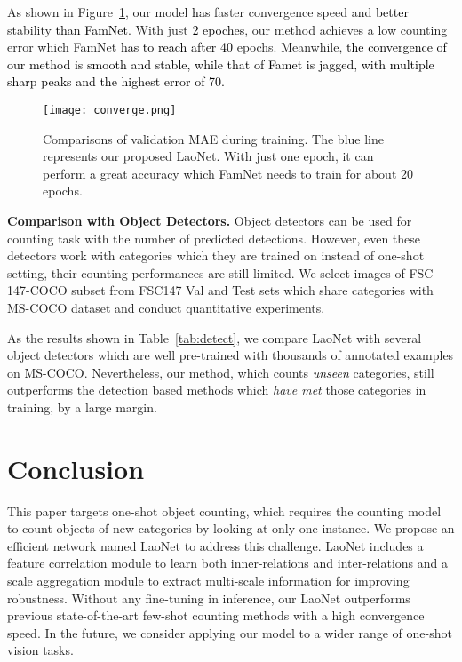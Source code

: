 \documentclass{article}
\newcommand\XP[1]{\textcolor{black}{#1}}\newcommand\XPC[1]{\textcolor{black}{[#1]}}
\begin{document}
As shown in Figure~\ref{fig:converge}, our model \XP{has} faster convergence speed and \XP{better} stability \XP{than FamNet}. With just \XP{2 epoches}, our method achieves a low counting error which FamNet \XP{has to reach after 40} epochs. Meanwhile, \XP{the convergence of our method is smooth and stable, while that of Famet is jagged, with multiple sharp peaks and the highest error of 70.}



\begin{figure}[t]
  \centering
  \texttt{[image: converge.png]}
   \caption{Comparisons of validation MAE during training. The blue line represents our proposed LaoNet. With just one epoch, it can perform a great accuracy which FamNet needs to train for about 20 epochs.}
   \label{fig:converge}
\end{figure}


\noindent \textbf{Comparison with Object Detectors.}
Object detectors can be used for counting task with the number of predicted detections. However, even these detectors work with categories which they are trained on instead of one-shot setting, their counting performances are still limited. We select images of FSC-147-COCO subset from FSC147 Val and Test sets which share categories with MS-COCO dataset and conduct quantitative experiments.

As the results shown in Table~\ref{tab:detect}, we compare LaoNet with several object detectors which are well pre-trained with thousands of annotated examples on MS-COCO. Nevertheless, our method, which counts \XP{\emph{unseen}} categories, still outperforms the detection based methods which \emph{have met} those categories in training, by a large margin.




\section{Conclusion}

This paper targets one-shot object counting, which requires the counting model to count objects of new categories by looking at only one instance. We propose an efficient network named LaoNet to address this challenge. LaoNet includes a feature correlation module to learn both inner-relations and inter-relations and a scale aggregation module to extract multi-scale information for improving robustness. Without any fine-tuning in inference, our LaoNet outperforms previous state-of-the-art few-shot counting methods with a high convergence speed. In the future, we consider applying our model to a wider range of one-shot vision tasks.








\end{document}
